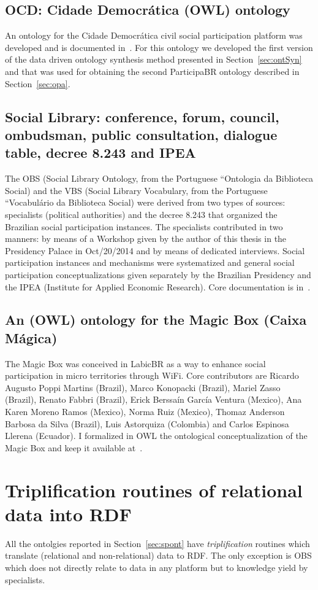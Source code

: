 \begin{apendicesenv}
\subsection{OCD: Cidade Democrática (OWL) ontology}
An ontology for the Cidade Democrática civil social participation platform was developed and is documented in~\cite{opa,ocd}.
For this ontology we developed the first version of the data driven ontology synthesis method presented in Section~\ref{sec:ontSyn}
and that was used for obtaining the second ParticipaBR ontology described in Section~\ref{sec:opa}.

\subsection{Social Library: conference, forum, council, ombudsman, public consultation, dialogue table, decree 8.243 and IPEA}
The OBS (Social Library Ontology, from the Portuguese ``Ontologia da Biblioteca Social)
and the VBS (Social Library Vocabulary, from the Portuguese ``Vocabulário da Biblioteca Social)
were derived from two types of sources: specialists (political authorities)
and the decree 8.243 that organized the Brazilian social participation instances.
The specialists contributed in two manners: by means of a Workshop given by the author 
of this thesis in the Presidency Palace in Oct/20/2014
and by means of dedicated interviews.
Social participation instances and mechanisms were systematized and general
social participation conceptualizations given separately by the Brazilian Presidency
and the IPEA (Institute for Applied Economic Research).
Core documentation is in~\cite{opa,vocabP}.

\subsection{An (OWL) ontology for the Magic Box (Caixa Mágica)}\label{sec:mb}
The Magic Box was conceived in LabicBR as a way to enhance social participation
in micro territories through WiFi.
Core contributors are Ricardo Augusto Poppi Martins (Brazil), Marco Konopacki (Brazil),
Mariel Zasso (Brazil), Renato Fabbri (Brazil), Erick Berssaín García Ventura (Mexico),
Ana Karen Moreno Ramos (Mexico), Norma Ruiz (Mexico),
Thomaz Anderson Barbosa da Silva (Brazil), Luis Astorquiza (Colombia) and Carlos Espinosa Llerena (Ecuador).
I formalized in OWL the ontological conceptualization of the Magic Box and keep it available at~\cite{caixamagica}.

\section{Triplification routines of relational data into RDF}
All the ontolgies reported in Section~\ref{sec:spont} have \emph{triplification}
routines which translate (relational and non-relational) data to RDF.
The only exception is OBS which does not directly relate to data in any platform
but to knowledge yield by specialists.


\end{apendicesenv}
